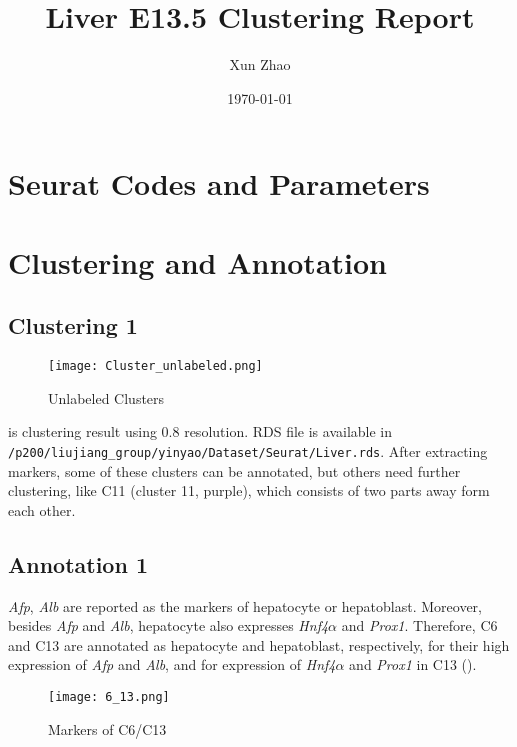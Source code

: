 \documentclass[lang=en]{elegantpaper}
\title{Liver E13.5 Clustering Report}
\author{Xun Zhao}
\date{\today}
\begin{document}
\maketitle

\section{Seurat Codes and Parameters}
\section{Clustering and Annotation}

\subsection{Clustering 1}

\begin{figure}[htbp]
    \centering
    \texttt{[image: Cluster\_unlabeled.png]}
    \caption{Unlabeled Clusters \label{unlabel_total}}
\end{figure}

 is clustering result using 0.8 resolution. RDS file is available in \lstinline{/p200/liujiang_group/yinyao/Dataset/Seurat/Liver.rds}. After extracting markers, some of these clusters can be annotated, but others need further clustering, like C11 (cluster 11, purple), which consists of two parts away form each other.

\subsection{Annotation 1}

\emph{Afp}, \emph{Alb} are reported as the markers of hepatocyte or hepatoblast\citep{gordillo_orchestrating_2015, chaudhari_expression_2016, su_single-cell_2017, han_mapping_2018}. Moreover, besides \emph{Afp} and \emph{Alb}, hepatocyte also expresses \emph{Hnf4$\alpha$} and \emph{Prox1}\citep{gordillo_orchestrating_2015}. Therefore, C6 and C13 are annotated as hepatocyte and hepatoblast, respectively, for their high expression of \emph{Afp} and \emph{Alb}, and for expression of \emph{Hnf4$\alpha$} and \emph{Prox1} in C13 ().

\begin{figure}[htbp]
    \centering
    \texttt{[image: 6\_13.png]}
    \caption{Markers of C6/C13 \label{6_13}}
\end{figure}
\end{document}
